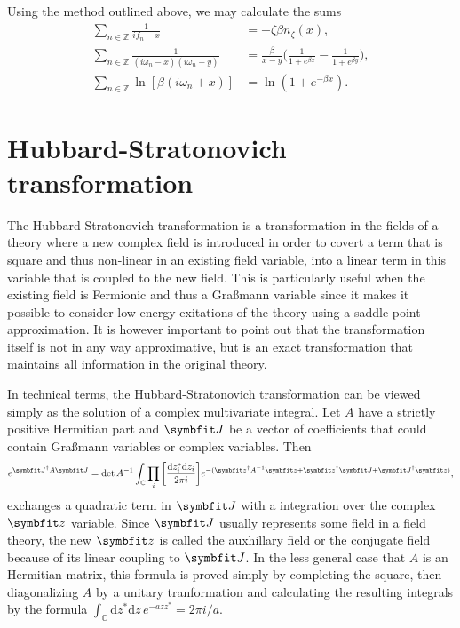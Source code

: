 Using the method outlined above, we may calculate the sums
\begin{subequations}
    \label{eq:Field:Mats:sums}
    \begin{align}
        \label{eq:Field:mats:sums:singlePole}
        \sum_{n\in\mathbb{Z}}\frac{1}{if_n-x} &= -\zeta\beta n_\zeta(x),\\
        \sum_{n\in\mathbb{Z}}\frac{1}{(i\omega_n - x)(i\omega_n - y)} &= \frac{\beta}{x-y}\bigg(\frac{1}{1+e^{\beta x}} - \frac{1}{1+e^{\beta y}}\bigg),\label{eq:Field:Mats:sums:twoPoles}\\
        \sum_{n\in\mathbb{Z}}\ln[\beta(i\omega_n + x)] &= \ln(1+e^{-\beta x}).\label{eq:Field:Mats:sums:ln}
    \end{align}
\end{subequations}

\section{Hubbard-Stratonovich transformation}

The Hubbard-Stratonovich transformation is a transformation in the fields of a theory where a new complex field is introduced
in order to covert a term that is square and thus non-linear in an existing field variable, into a linear term in this
variable that is coupled to the new field. This is particularly useful when the existing field is Fermionic and thus
a Gra\ss mann variable since it makes it possible to consider low energy exitations of the theory using \eg a saddle-point
approximation. It is however important to point out that the transformation itself is not in any way approximative, but is
an exact transformation that maintains all information in the original theory.

In technical terms, the Hubbard-Stratonovich transformation can be viewed simply as the solution of a complex multivariate integral.
Let $A$ have a strictly positive Hermitian part and $\v{J}$ be a vector of
coefficients that could contain Gra\ss mann variables or complex variables. Then
\begin{equation}
    \label{eq:Field:HS:complexIntegral}
    e^{\v{J}^\dagger A \v{J}} = \det A^{-1}\int_{\mathbb{C}}\prod_{i}\bigg[\frac{\mathrm{d}z_i^\ast\mathrm{d}z_i}{2\pi i}\bigg]e^{-(\v{z}^\dagger A^{-1}\v{z} + \v{z}^\dagger \v{J} + \v{J}^\dagger\v{z})},
\end{equation}
exchanges a quadratic term in $\v{J}$ with a integration over the complex $\v{z}$ variable.
Since $\v{J}$ usually represents some field in a field theory, the new $\v{z}$ is called the auxhillary field or the conjugate
field because of its linear coupling to $\v{J}$.
In the less general case that $A$ is an Hermitian matrix, this formula is proved simply by completing the square, then
diagonalizing $A$ by a unitary tranformation and calculating the resulting integrals by the formula 
$\int_{\mathbb{C}}\!\mathrm{d}z^\ast\mathrm{d}z\,e^{-azz^\ast} = 2\pi i /a$. 

